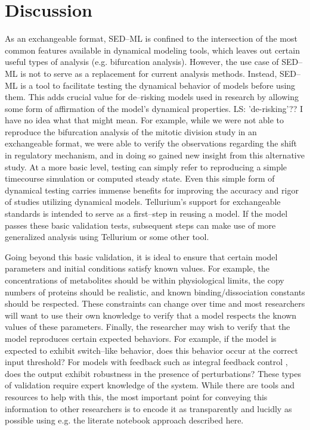 \documentclass[10pt,letterpaper]{article}
\begin{document}
\section*{Discussion}

As an exchangeable format, SED--ML is confined to the intersection of the most common features available in dynamical modeling tools, which leaves out certain useful types of analysis (e.g. bifurcation analysis). However, the use case of SED--ML is not to serve as a replacement for current analysis methods. Instead, SED--ML is a tool to facilitate testing the dynamical behavior of models before using them. This adds crucial value for de--risking models used in research by allowing some form of affirmation of the model's dynamical properties. {\color{green} LS: 'de-risking'??  I have no idea what that might mean.} For example, while we were not able to reproduce the bifurcation analysis of the mitotic division study \cite{calzone2007dynamical} in an exchangeable format, we were able to verify the observations regarding the shift in regulatory mechanism, and in doing so gained new insight from this alternative study. At a more basic level, testing can simply refer to reproducing a simple timecourse simulation or computed steady state.
Even this simple form of dynamical testing carries immense benefits for improving the accuracy and rigor of studies utilizing dynamical models. Tellurium's support for exchangeable standards is intended to serve as a first--step in reusing a model. If the model passes these basic validation tests, subsequent steps can make use of more generalized analysis using Tellurium or some other tool.

Going beyond this basic validation, it is ideal to ensure that certain model parameters and initial conditions satisfy known values. For example, the concentrations of metabolites should be within physiological limits, the copy numbers of proteins should be realistic, and known binding/dissociation constants should be respected. These constraints can change over time and most researchers will want to use their own knowledge to verify that a model respects the known values of these parameters. Finally, the researcher may wish to verify that the model reproduces certain expected behaviors. For example, if the model is expected to exhibit switch--like behavior, does this behavior occur at the correct input threshold? For models with feedback such as integral feedback control \cite{briat2016antithetic}, does the output exhibit robustness in the presence of perturbations? These types of validation require expert knowledge of the system. While there are tools and resources to help with this, the most important point for conveying this information to other researchers is to encode it as transparently and lucidly as possible using e.g. the literate notebook approach described here.
\end{document}

